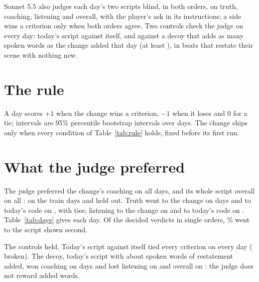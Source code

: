 \documentclass[11pt]{article}
\begin{document}
Sonnet 5.5 also judges each day's two scripts blind, in both orders, on truth, coaching, listening
and overall, with the player's ask in its instructions; a side wins a criterion only when both
orders agree. Two controls check the judge on every day: today's script against itself, and against
a decoy that adds as many spoken words as the change added that day (at least \MinDecoyWords), in
beats that restate their scene with nothing new.

\section{The rule}

A day scores $+1$ when the change wins a criterion, $-1$ when it loses and $0$ for a tie; intervals
are 95\% percentile bootstrap intervals over days. The change ships only when every condition of
Table~\ref{tab:rule} holds, fixed before its first run.

\begin{table}[h]
\centering
\small\RuleTable
\caption{The rule, fixed before the change's first run. Coaching and overall are the judge's scores
per day; the claim rows, the asked moves and the unsound better moves are the audit's numbers per
script, the change minus today's code; the verdict lines are the script's own count; the length is
the change's script heard once over today's on the same day. Kept: \Kept.}
\label{tab:rule}
\end{table}

\section{What the judge preferred}

The judge preferred the change's coaching on all \Days{} days, and its whole script overall on all
\Days: \TrainCoaching{} on the train days and \HeldCoaching{} held out. Truth went to the change on
\TruthWins{} days and to today's code on \TruthLosses, with \TruthTies{} ties; listening to the change
on \ListeningWins{} and to today's code on \ListeningLosses. Table~\ref{tab:days} gives each day. Of
the \Decided{} decided verdicts in single orders, \SecondShare\% went to the script shown second.

The controls held. Today's script against itself tied every criterion on every day
(\SameBroken{} broken). The decoy, today's script with about \DecoyAdded{} spoken words of
restatement added, won coaching on \DecoyCoaching{} days and lost listening on
\DecoyLostListening{} and overall on \DecoyLostOverall: the judge does not reward added words.
\end{document}
